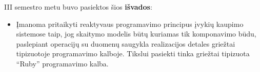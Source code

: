 \documentclass{VUMIFPSmagistrinis}
\begin{document}
III semestro metu buvo pasiektos šios \textbf{išvados}:

\begin{itemize}
  \item Įmanoma pritaikyti reaktyvaus programavimo principus įvykių kaupimo sistemose taip, jog skaitymo modelis būtų kuriamas tik komponavimo būdu, paslepiant operacijų su duomenų saugykla realizacijos detales griežtai tipizuotoje programavimo kalboje. Tikslui pasiekti tinka griežtai tipizuota ``Ruby'' programavimo kalba.

\end{itemize}

\printbibliography[heading=bibintoc]  %




\end{document}
